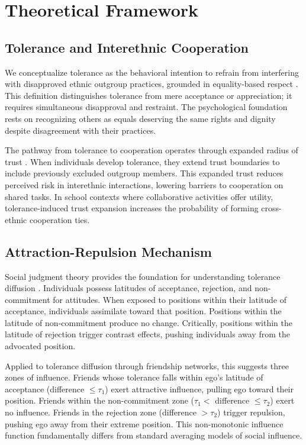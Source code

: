 \documentclass[12pt,a4paper]{article}
\begin{document}

\section{Theoretical Framework}

\subsection{Tolerance and Interethnic Cooperation}

We conceptualize tolerance as the behavioral intention to refrain from interfering with disapproved ethnic outgroup practices, grounded in equality-based respect \citep{simon2023tolerance}. This definition distinguishes tolerance from mere acceptance or appreciation; it requires simultaneous disapproval and restraint. The psychological foundation rests on recognizing others as equals deserving the same rights and dignity despite disagreement with their practices.

The pathway from tolerance to cooperation operates through expanded radius of trust \citep{eriksson2021tolerance}. When individuals develop tolerance, they extend trust boundaries to include previously excluded outgroup members. This expanded trust reduces perceived risk in interethnic interactions, lowering barriers to cooperation on shared tasks. In school contexts where collaborative activities offer utility, tolerance-induced trust expansion increases the probability of forming cross-ethnic cooperation ties.

\subsection{Attraction-Repulsion Mechanism}

Social judgment theory provides the foundation for understanding tolerance diffusion \citep{sherif1961social}. Individuals possess latitudes of acceptance, rejection, and non-commitment for attitudes. When exposed to positions within their latitude of acceptance, individuals assimilate toward that position. Positions within the latitude of non-commitment produce no change. Critically, positions within the latitude of rejection trigger contrast effects, pushing individuals away from the advocated position.

Applied to tolerance diffusion through friendship networks, this suggests three zones of influence. Friends whose tolerance falls within ego's latitude of acceptance (difference $\leq \tau_1$) exert attractive influence, pulling ego toward their position. Friends within the non-commitment zone ($\tau_1 < $ difference $\leq \tau_2$) exert no influence. Friends in the rejection zone (difference $> \tau_2$) trigger repulsion, pushing ego away from their extreme position. This non-monotonic influence function fundamentally differs from standard averaging models of social influence.
\end{document}
